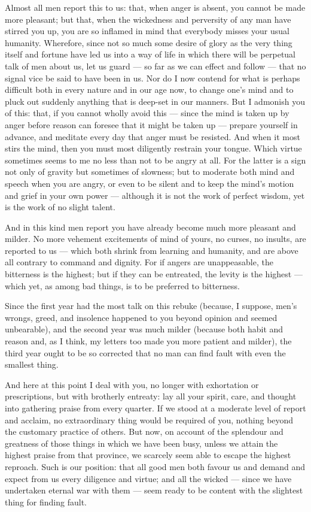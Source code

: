  Almost all men report this to us: that, when anger is absent, you cannot be made more pleasant; but that, when the wickedness and perversity of any man have stirred you up, you are so inflamed in mind that everybody misses your usual humanity. Wherefore, since not so much some desire of glory as the very thing itself and fortune have led us into a way of life in which there will be perpetual talk of men about us, let us guard --- so far as we can effect and follow --- that no signal vice be said to have been in us. Nor do I now contend for what is perhaps difficult both in every nature and in our age now, to change one's mind and to pluck out suddenly anything that is deep-set in our manners. But I admonish you of this: that, if you cannot wholly avoid this --- since the mind is taken up by anger before reason can foresee that it might be taken up --- prepare yourself in advance, and meditate every day that anger must be resisted. And when it most stirs the mind, then you must most diligently restrain your tongue. Which virtue sometimes seems to me no less than not to be angry at all. For the latter is a sign not only of gravity but sometimes of slowness; but to moderate both mind and speech when you are angry, or even to be silent and to keep the mind's motion and grief in your own power --- although it is not the work of perfect wisdom, yet is the work of no slight talent.

 And in this kind men report you have already become much more pleasant and milder. No more vehement excitements of mind of yours, no curses, no insults, are reported to us --- which both shrink from learning and humanity, and are above all contrary to command and dignity. For if angers are unappeasable, the bitterness is the highest; but if they can be entreated, the levity is the highest --- which yet, as among bad things, is to be preferred to bitterness.

 Since the first year had the most talk on this rebuke (because, I suppose, men's wrongs, greed, and insolence happened to you beyond opinion and seemed unbearable), and the second year was much milder (because both habit and reason and, as I think, my letters too made you more patient and milder), the third year ought to be so corrected that no man can find fault with even the smallest thing.

 And here at this point I deal with you, no longer with exhortation or prescriptions, but with brotherly entreaty: lay all your spirit, care, and thought into gathering praise from every quarter. If we stood at a moderate level of report and acclaim, no extraordinary thing would be required of you, nothing beyond the customary practice of others. But now, on account of the splendour and greatness of those things in which we have been busy, unless we attain the highest praise from that province, we scarcely seem able to escape the highest reproach. Such is our position: that all good men both favour us and demand and expect from us every diligence and virtue; and all the wicked --- since we have undertaken eternal war with them --- seem ready to be content with the slightest thing for finding fault.


